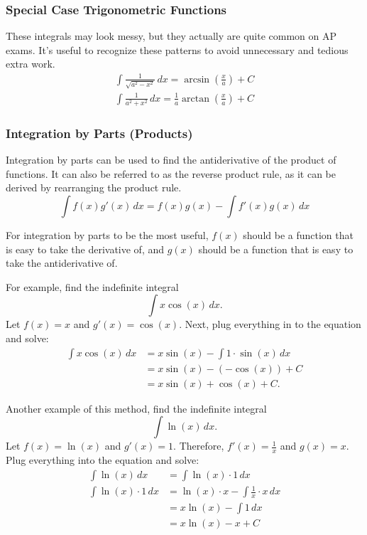 \documentclass[12pt]{article}
\begin{document}
            \subsubsection{Special Case Trigonometric Functions}
            \label{sec:arctanintegral}
                These integrals may look messy, but they actually are quite common on AP exams. It's useful to recognize these patterns to avoid unnecessary and tedious extra work.
                \begin{gather*}
                    \int \frac{1}{\sqrt{a^2 - x^2}} \, dx = \arcsin \left( \frac{x}{a} \right) + C \\[6pt]
                    \int \frac{1}{a^2 + x^2} \, dx = \frac{1}{a} \arctan \left( \frac{x}{a} \right) + C
                \end{gather*}

            \subsubsection{Integration by Parts (Products)}
                Integration by parts can be used to find the antiderivative of the product of functions. It can also be referred to as the reverse product rule, as it can be derived by rearranging the product rule.
                \[ \int f(x) g'(x) \, dx = f(x) g(x) - \int f'(x) g(x) \, dx \]

                For integration by parts to be the most useful, $f(x)$ should be a function that is easy to take the derivative of, and $g(x)$ should be a function that is easy to take the antiderivative of.

                \noindent For example, find the indefinite integral
                \[ \int x \cos(x) \, dx. \]
                Let $f(x) = x$ and $g'(x) = \cos(x)$. Next, plug everything in to the equation and solve:
                \begin{align*}
                    \int x \cos(x) \, dx &= x \sin(x) - \int 1 \cdot \sin(x) \, dx \\
                    &= x \sin(x) - \left( -\cos(x) \right) + C \\
                    &= x\sin(x) + \cos(x) + C.
                \end{align*}

                \noindent Another example of this method, find the indefinite integral
                \[ \int \ln(x) \, dx. \]
                Let $f(x) = \ln(x)$ and $g'(x) = 1$. Therefore, $f'(x) = \frac{1}{x}$ and $g(x) = x$. Plug everything into the equation and solve:
                \begin{align*}
                    \int \ln(x) \, dx &= \int \ln(x) \cdot 1 \, dx \\
                    \int \ln(x) \cdot 1 \, dx &= \ln(x) \cdot x - \int \frac{1}{x} \cdot x \, dx \\[6pt]
                    &= x \ln(x) - \int 1 \, dx \\
                    &= x \ln(x) - x + C
                \end{align*}
\end{document}
